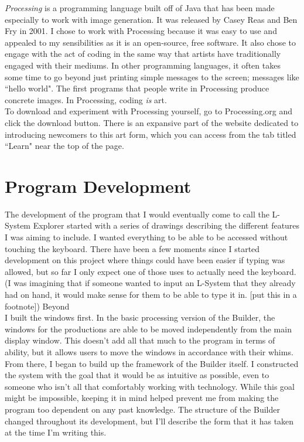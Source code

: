 \documentclass[12pt,twoside]{reedthesis}
\begin{document}
	\textit{Processing} is a programming language built off of Java that has been made especially to work with image generation. It was released by Casey Reas and Ben Fry in 2001. I chose to work with Processing because it was easy to use and appealed to my sensibilities as it is an open-source, free software. It also chose to engage with the act of coding in the same way that artists have traditionally engaged with their mediums. In other programming languages, it often takes some time to go beyond just printing simple messages to the screen; messages like ``hello world". The first programs that people write in Processing produce concrete images. In Processing, coding \textit{is} art. \\
	
	To download and experiment with Processing yourself, go to Processing.org and click the download button. There is an expansive part of the website dedicated to introducing newcomers to this art form, which you can access from the tab titled ``Learn" near the top of the page.\\

\section{Program Development}

	The development of the program that I would eventually come to call the L-System Explorer started with a series of drawings describing the different features I was aiming to include. I wanted everything to be able to be accessed without touching the keyboard. There have been a few moments since I started development on this project where things could have been easier if typing was allowed, but so far I only expect one of those uses to actually need the keyboard. (I was imagining that if someone wanted to input an L-System that they already had on hand, it would make sense for them to be able to type it in. [put this in a footnote]) Beyond \\
	
	I built the windows first. In the basic processing version of the Builder, the windows for the productions are able to be moved independently from the main display window. This doesn't add all that much to the program in terms of ability, but it allows users to move the windows in accordance with their whims. From there, I began to build up the framework of the Builder itself. I constructed the system with the goal that it would be as intuitive as possible, even to someone who isn't all that comfortably working with technology. While this goal might be impossible, keeping it in mind helped prevent me from making the program too dependent on any past knowledge. The structure of the Builder changed throughout its development, but I'll describe the form that it has taken at the time I'm writing this.\\
	
\end{document}
